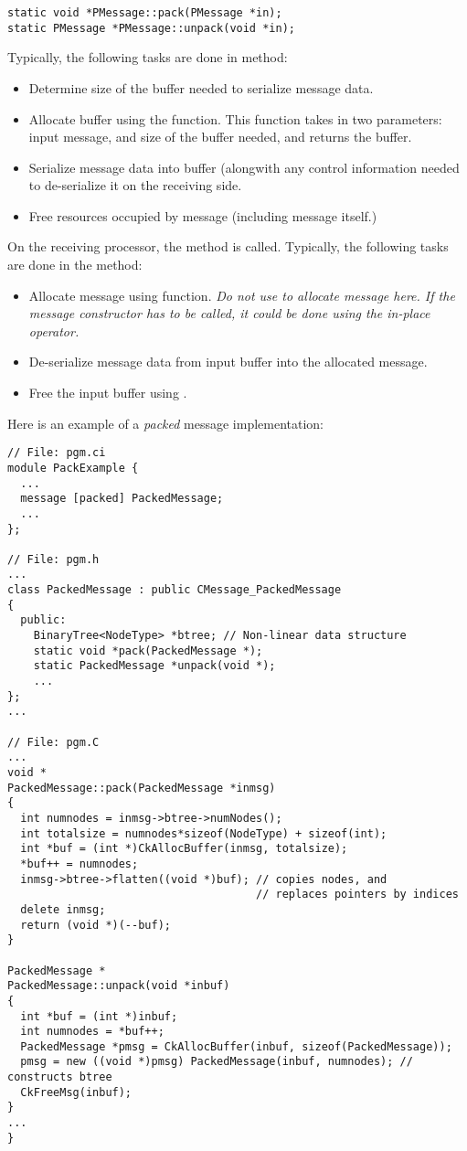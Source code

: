 \begin{verbatim}
static void *PMessage::pack(PMessage *in);
static PMessage *PMessage::unpack(void *in);
\end{verbatim}

Typically, the following tasks are done in  method:

\begin{itemize}
\item Determine size of the buffer needed to serialize message data.
\item Allocate buffer using the 
 function. This
function takes in two parameters: input message, and size of the
buffer needed, and returns the buffer.
\item Serialize message data into buffer (alongwith any control
information needed to de-serialize it on the receiving side.
\item Free resources occupied by message (including message itself.)  
\end{itemize}

On the receiving processor, the  method is
called. Typically, the following tasks are done in the 
method:

\begin{itemize}
\item Allocate message using  function. {\em Do not
use  to allocate message here. If the message constructor has
to be called, it could be done using the in-place  
operator.}
\item De-serialize message data from input buffer into the allocated message.
\item Free the input buffer using .
\end{itemize}

Here is an example of a {\em packed} message implementation:

\begin{verbatim}
// File: pgm.ci
module PackExample {
  ...
  message [packed] PackedMessage;
  ...
};

// File: pgm.h
...
class PackedMessage : public CMessage_PackedMessage
{
  public:
    BinaryTree<NodeType> *btree; // Non-linear data structure
    static void *pack(PackedMessage *);
    static PackedMessage *unpack(void *);
    ...
};
...

// File: pgm.C
...
void *
PackedMessage::pack(PackedMessage *inmsg)
{
  int numnodes = inmsg->btree->numNodes();
  int totalsize = numnodes*sizeof(NodeType) + sizeof(int);
  int *buf = (int *)CkAllocBuffer(inmsg, totalsize);
  *buf++ = numnodes;
  inmsg->btree->flatten((void *)buf); // copies nodes, and 
                                      // replaces pointers by indices
  delete inmsg;
  return (void *)(--buf);
}

PackedMessage *
PackedMessage::unpack(void *inbuf)
{
  int *buf = (int *)inbuf;
  int numnodes = *buf++;
  PackedMessage *pmsg = CkAllocBuffer(inbuf, sizeof(PackedMessage));
  pmsg = new ((void *)pmsg) PackedMessage(inbuf, numnodes); // constructs btree
  CkFreeMsg(inbuf);
}
... 
}
\end{verbatim}


